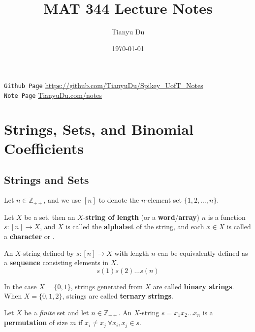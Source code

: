 \documentclass{article}
\title{MAT 344 Lecture Notes}
\date{\today}
\author{Tianyu Du}
\def\Z{{\mathbb Z}}
\begin{document}
	\maketitle
	\doclicenseThis
	\texttt{Github Page} \url{https://github.com/TianyuDu/Spikey_UofT_Notes}\\
	\texttt{Note Page} \url{TianyuDu.com/notes}
	\tableofcontents
	\newpage
	
	\section{Strings, Sets, and Binomial Coefficients}
		\subsection{Strings and Sets}
			\begin{notation}
				Let $n \in \Z_{++}$, and we use $[n]$ to denote the $n$-element set $\{1,2,\dots,n\}$.
			\end{notation}
			
			\begin{definition}
				Let $X$ be a set, then an $X$-\textbf{string of length} (or a \textbf{word}/\textbf{array}) $n$ is a function $s:[n] \to X$, and $X$ is called the \textbf{alphabet} of the string, and each $x \in X$ is called a \textbf{character} or .
			\end{definition}
			
			\begin{remark}
				An $X$-string defined by $s: [n] \to X$ with length $n$ can be equivalently defined as a \textbf{sequence} consisting elements in $X$.
				\begin{equation}
					s(1)s(2)\dots s(n)
				\end{equation}
			\end{remark}
			
			\begin{definition}
				In the case $X = \{0, 1\}$, strings generated from $X$ are called \textbf{binary strings}. When $X = \{0,1,2\}$, strings are called \textbf{ternary strings}.
			\end{definition}
			
			\begin{definition}
				Let $X$ be a \emph{finite} set and let $n \in \Z_{++}$. An $X$-string $s = x_1 x_2 \dots x_n$ is a \textbf{permutation} of size $m$ if $x_i \neq x_j\ \forall x_i, x_j \in s$.
			\end{definition}
			
\end{document}

